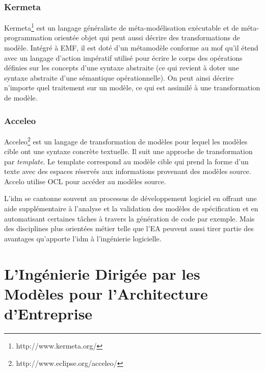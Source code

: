 \subsubsection{Kermeta}
Kermeta\footnote{http://www.kermeta.org/} est un langage généraliste de méta-modélisation exécutable et de 
méta-programmation orientée objet qui peut aussi décrire des transformations de 
modèle. Intégré à EMF, il est doté d'un métamodèle conforme au \gls{mof} qu'il étend 
avec un langage d'action impératif utilisé pour écrire le corps des opérations 
définies sur les concepts d'une syntaxe abstraite (ce qui revient à doter une 
syntaxe abstraite d'une sémantique opérationnelle). On peut ainsi décrire 
n'importe quel traitement sur un modèle, ce qui est assimilé à une transformation 
de modèle.


\subsubsection{Acceleo}
Acceleo\footnote{http://www.eclipse.org/acceleo/} est un langage de transformation de modèles pour lequel les modèles cible ont une syntaxe concrète textuelle. Il suit une approche de transformation par \textit{template}. Le template correspond au modèle cible qui prend la forme d'un texte avec des espaces réservés aux informations provenant des modèles source. Accelo utilise OCL pour accéder au modèles source.


L'\gls{idm} se cantonne souvent au processus de développement logiciel en offrant une aide supplémentaire à l'analyse et la validation des modèles de spécification et en automatisant certaines tâches à travers la génération de code par exemple. Mais des disciplines plus orientées métier telle que l'EA peuvent aussi tirer partie des avantages qu'apporte l'\gls{idm} à l'ingénierie logicielle.


\section{L'Ingénierie Dirigée par les Modèles pour l'Architecture d'Entreprise}
\label{sec:idm_for_ea}

